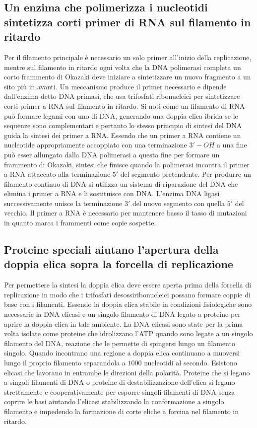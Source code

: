 \subsection{Un enzima che polimerizza i nucleotidi sintetizza corti primer di RNA sul filamento in ritardo}
Per il filamento principale \`e necessario un solo primer all'inizio della replicazione, mentre sul filamento in ritardo ogni volta che la DNA polimerasi completa un corto frammento di
Okazaki deve iniziare a sintetizzare un nuovo fragmento a un sito pi\`u in avanti. Un meccanismo produce il primer necessario e dipende dall'enzima detto DNA primasi, che usa trifosfati
ribonucleici per sintetizzare corti primer a RNA sul filamento in ritardo. Si noti come un filamento di RNA pu\`o formare legami con uno di DNA, generando una doppia elica ibrida se 
le sequenze sono complementari e pertanto lo stesso principio di sintesi del DNA guida la sintesi dei primer a RNA. Essendo che un primer a RNA contiene un nucleotide appropriamente
accoppiato con una terminazione $3'-OH$ a una fine pu\`o esser allungato dalla DNA polimerasi a questa fine per formare un frammento di Okazaki, sintesi che finisce quando la
polimerasi incontra il primer a RNA attaccato alla terminazione $5'$ del segmento pretendente. Per produrre un filamento continuo di DNA si utilizza un sistema di riparazione del DNA
che elimina i primer a RNA e li sostituisce con DNA. L'enzima DNA ligasi successivamente unisce la terminazione $3'$ del nuovo segmento con quella $5'$ del vecchio. Il primer a RNA 
\`e necessario per mantenere basso il tasso di mutazioni in quanto marca i frammenti come copie sospette. 
\subsection{Proteine speciali aiutano l'apertura della doppia elica sopra la forcella di replicazione}
Per permettere la sintesi la doppia elica deve essere aperta prima della forcella di replicazione in modo che i trifosfati desossiribonucleici possano formare coppie di base con i 
filamenti. Essendo la doppia elica stabile in condizioni fisiologiche sono necessarie la DNA elicasi e un singolo filamento di DNA legato a proteine per aprire la doppia elica in tale
ambiente. La DNA elicasi sono state per la prima volta isolate come proteine che idrolizzano l'ATP quando sono legate a un singolo filamento del DNA, reazione che le permette di
spingersi lungo un filamento singolo. Quando incontrano una regione a doppia elica continuano a muoversi lungo il proprio filamento separandola a $1000$ nucleotidi al secondo. Esistono
elicasi che lavorano in entrambe le direzioni della polarit\`a. Proteine che si legano a singoli filamenti di DNA o proteine di destabilizzazione dell'elica si legano strettamente e
cooperativamente per esporre singoli filamenti di DNA senza coprire le basi aiutando l'elicasi stabilizzando la conformazione a singolo filamento e impedendo la formazione di corte 
eliche a forcina nel filamento in ritardo.
